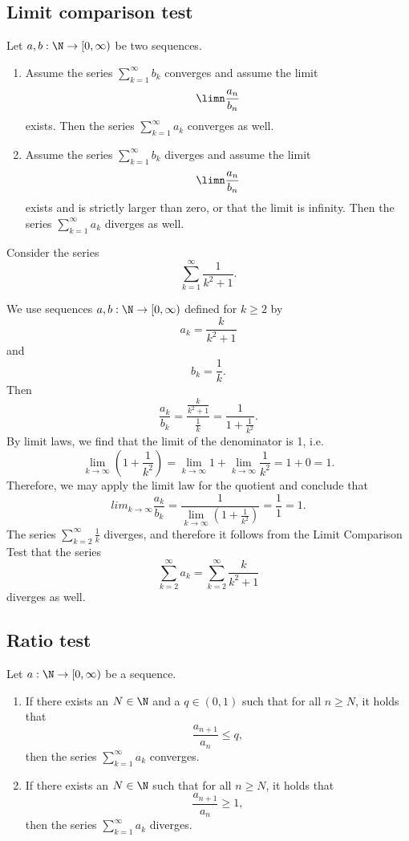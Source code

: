 \subsection{Limit comparison test}
\begin{theorem}
    Let $a,b: \N \to [0, \infty)$ be two sequences.
    \begin{enumerate}
        \item Assume the series $\sum_{k=1}^\infty b_k$ converges and assume the limit
            $$\limn \frac{a_n}{b_n}$$
            exists. Then the series $\sum_{k=1}^\infty a_k$ converges as well.
        \item Assume the series $\sum_{k=1}^\infty b_k$ diverges and assume the limit
            $$\limn \frac{a_n}{b_n}$$
            exists and is strictly larger than zero, or that the limit is infinity. Then the series $\sum_{k=1}^\infty a_k$ diverges as well.
    \end{enumerate}
\end{theorem}
\begin{example}
    Consider the series
    $$\sum_{k=1}^{\infty}\frac{1}{k^2+1}.$$

    We use sequences $a,b: \N \to [0, \infty)$ defined for $k \ge 2$ by
    $$a_k = \frac{k}{k^2+1}$$ and
    $$b_k = \frac{1}{k}.$$
    Then
    $$\frac{a_k}{b_k} = \frac{\frac{k }{k^2 + 1}}{\frac{1}{k }} = \frac{1}{1+\frac{1}{k^2}}.$$
    By limit laws, we find that the limit of the denominator is 1, i.e.
    $$\lim_{k\to\infty} \left(1 + \frac{1}{k^2}\right) = \lim_{k\to\infty} 1 + \lim_{k\to\infty} \frac{1}{k^2} = 1 + 0 = 1.$$
    Therefore, we may apply the limit law for the quotient and conclude that
    $$lim_{k\to\infty}\frac{a_k}{b_k} = \frac{1}{\lim_{k\to\infty}\left(1+\frac{1}{k^2}\right)} = \frac{1}{1} = 1.$$
    The series $\displaystyle\sum_{k=2 }^{\infty}\frac{1}{k}$ diverges, and therefore it follows from the Limit Comparison Test that the series
    $$\sum_{k=2 }^{\infty}a_k = \sum_{k=2 }^{\infty}\frac{k}{k^2+1}$$
    diverges as well.
\end{example}

\subsection{Ratio test}
\begin{theorem}
    Let $a: \N \to [0, \infty)$ be a sequence.
    \begin{enumerate}
        \item If there exists an $N \in \N$ and a $q \in (0,1)$ such that for all $n \ge N$, it holds that
            $$\frac{a_{n+1}}{a_n} \le q,$$
            then the series $\sum_{k=1}^\infty a_k$ converges.
        \item If there exists an $N \in \N$ such that for all $n \ge N$, it holds that
            $$\frac{a_{n+1}}{a_n} \ge 1,$$
            then the series $\sum_{k=1}^\infty a_k$ diverges.
    \end{enumerate}
\end{theorem}

